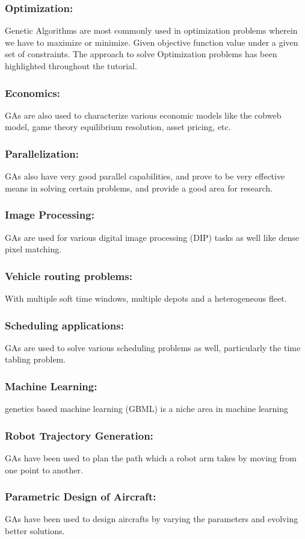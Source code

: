 \subsubsection{Optimization:}
Genetic Algorithms are most commonly used in
optimization problems wherein we have to maximize or minimize.
Given objective function value under a given set of constraints. The
approach to solve Optimization problems has been highlighted
throughout the tutorial. 
\subsubsection{Economics:}
GAs are also used to characterize various economic
models like the cobweb model, game theory equilibrium resolution,
asset pricing, etc.
\subsubsection{Parallelization:}GAs also have very good parallel capabilities, and
prove to be very effective means in solving certain problems, and
provide a good area for research.
\subsubsection{Image Processing:} GAs are used for various digital image processing
(DIP) tasks as well like dense pixel matching.
\subsubsection{Vehicle routing problems:} With multiple soft time windows, multiple
depots and a heterogeneous fleet.
\subsubsection{Scheduling applications:}GAs are used to solve various scheduling
problems as well, particularly the time tabling problem.
\subsubsection{Machine Learning:}genetics based machine learning (GBML) is a
niche area in machine learning
\subsubsection{Robot Trajectory Generation:}GAs have been used to plan the path
which a robot arm takes by moving from one point to another.
\subsubsection{Parametric Design of Aircraft:}GAs have been used to design
aircrafts by varying the parameters and evolving better solutions.
\newpage

